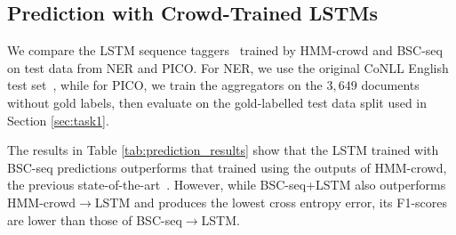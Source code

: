 \subsection{Prediction with Crowd-Trained LSTMs}\label{sec:task2}

We compare the LSTM sequence taggers~\cite{lample2016neural}
trained by HMM-crowd and BSC-seq on test data from NER and PICO. 
For NER, we use the original CoNLL English test set~\cite{tjong2003introduction},
while for PICO, we train the aggregators on the $3,649$ documents without gold labels, 
then evaluate on the gold-labelled test data split used in Section \ref{sec:task1}.

The results in Table \ref{tab:prediction_results} show that the LSTM trained with 
BSC-seq predictions outperforms that trained using the outputs of HMM-crowd, 
the previous state-of-the-art~\cite{nguyen2017aggregating}.
 However, while BSC-seq+LSTM also outperforms
HMM-crowd$\rightarrow$LSTM and produces the lowest cross entropy error, 
its F1-scores are lower than those of BSC-seq$\rightarrow$LSTM. 

